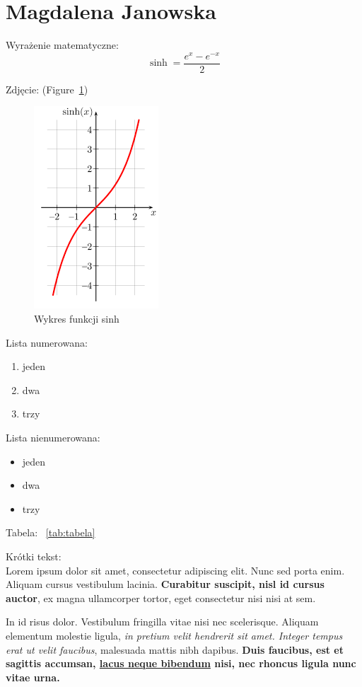 \section{Magdalena Janowska}
 Wyrażenie matematyczne:
\[\sinh=\frac{e^{x}-e^{-x}}{2}\]

 Zdjęcie: (Figure~\ref{fig:wykres})
\begin{figure} [htbp]
    \centering
    \includegraphics[scale=0.8]{pictures/wykres.png}
    \caption{Wykres funkcji sinh}
    \label{fig:wykres}
\end{figure}
 
 Lista numerowana:
\begin{enumerate}
    \item jeden
    \item dwa
    \item trzy
\end{enumerate}

 Lista nienumerowana:
\begin{itemize}
    \item jeden
    \item dwa
    \item trzy
\end{itemize}
 

 Tabela: ~\ref{tab:tabela}


 Krótki tekst:\\
 
Lorem ipsum dolor sit amet, consectetur adipiscing elit. Nunc sed porta enim. Aliquam cursus vestibulum lacinia. \textbf{Curabitur suscipit, nisl id cursus auctor}, ex magna ullamcorper tortor, eget consectetur nisi nisi at sem.

In id risus dolor. Vestibulum fringilla vitae nisi nec scelerisque. Aliquam elementum molestie ligula, \emph{ in pretium velit hendrerit sit amet. Integer tempus erat ut velit faucibus}, malesuada mattis nibh dapibus. \textbf{Duis faucibus, est et sagittis accumsan,  \underline{lacus neque bibendum} nisi, nec rhoncus ligula nunc vitae urna.} 

    
    